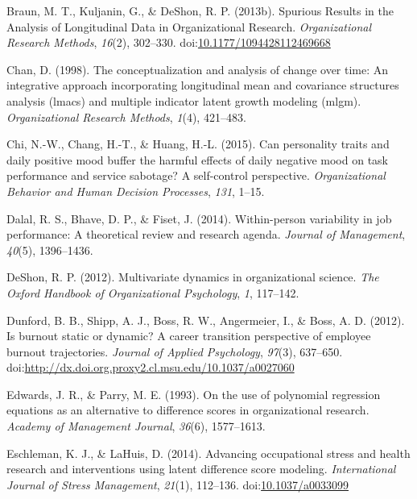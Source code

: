 \documentclass[english,,man]{apa6}
\begin{document}
\leavevmode\hypertarget{ref-braun_spurious_2013}{}%
Braun, M. T., Kuljanin, G., \& DeShon, R. P. (2013b). Spurious Results in the Analysis of Longitudinal Data in Organizational Research. \emph{Organizational Research Methods}, \emph{16}(2), 302--330. doi:\href{https://doi.org/10.1177/1094428112469668}{10.1177/1094428112469668}

\leavevmode\hypertarget{ref-chan1998conceptualization}{}%
Chan, D. (1998). The conceptualization and analysis of change over time: An integrative approach incorporating longitudinal mean and covariance structures analysis (lmacs) and multiple indicator latent growth modeling (mlgm). \emph{Organizational Research Methods}, \emph{1}(4), 421--483.

\leavevmode\hypertarget{ref-chi_can_2015}{}%
Chi, N.-W., Chang, H.-T., \& Huang, H.-L. (2015). Can personality traits and daily positive mood buffer the harmful effects of daily negative mood on task performance and service sabotage? A self-control perspective. \emph{Organizational Behavior and Human Decision Processes}, \emph{131}, 1--15.

\leavevmode\hypertarget{ref-dalal2014within}{}%
Dalal, R. S., Bhave, D. P., \& Fiset, J. (2014). Within-person variability in job performance: A theoretical review and research agenda. \emph{Journal of Management}, \emph{40}(5), 1396--1436.

\leavevmode\hypertarget{ref-deshon_multivariate_2012}{}%
DeShon, R. P. (2012). Multivariate dynamics in organizational science. \emph{The Oxford Handbook of Organizational Psychology}, \emph{1}, 117--142.

\leavevmode\hypertarget{ref-dunford_is_2012}{}%
Dunford, B. B., Shipp, A. J., Boss, R. W., Angermeier, I., \& Boss, A. D. (2012). Is burnout static or dynamic? A career transition perspective of employee burnout trajectories. \emph{Journal of Applied Psychology}, \emph{97}(3), 637--650. doi:\href{https://doi.org/http://dx.doi.org.proxy2.cl.msu.edu/10.1037/a0027060}{http://dx.doi.org.proxy2.cl.msu.edu/10.1037/a0027060}

\leavevmode\hypertarget{ref-edwards1993use}{}%
Edwards, J. R., \& Parry, M. E. (1993). On the use of polynomial regression equations as an alternative to difference scores in organizational research. \emph{Academy of Management Journal}, \emph{36}(6), 1577--1613.

\leavevmode\hypertarget{ref-eschleman_advancing_2014}{}%
Eschleman, K. J., \& LaHuis, D. (2014). Advancing occupational stress and health research and interventions using latent difference score modeling. \emph{International Journal of Stress Management}, \emph{21}(1), 112--136. doi:\href{https://doi.org/10.1037/a0033099}{10.1037/a0033099}
\end{document}
